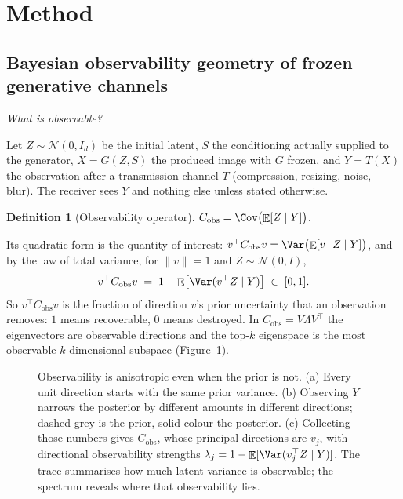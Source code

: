 \documentclass{article}
\theoremstyle{definition}
\newtheorem{definition}{Definition}
\DeclareMathOperator{\Exp}{\mathbb{E}}
\newcommand{\Cobs}{C_{\mathrm{obs}}}
\begin{document}
\section{Method}

\subsection{Bayesian observability geometry of frozen generative channels}
\label{sec:geometry}

\emph{What is observable?}

Let $Z\sim\mathcal N(0,I_d)$ be the initial latent, $S$ the conditioning actually supplied
to the generator, $X=G(Z,S)$ the produced image with $G$ frozen, and $Y=T(X)$ the
observation after a transmission channel $T$ (compression, resizing, noise, blur). The
receiver sees $Y$ and nothing else unless stated otherwise.

\begin{definition}[Observability operator]
$\Cobs=\Cov\bigl(\Exp[Z\mid Y]\bigr)$.
\end{definition}

Its quadratic form is the quantity of interest:
$v^\top\Cobs v=\Var\bigl(\Exp[v^\top Z\mid Y]\bigr)$, and by the law of total variance,
for $\|v\|=1$ and $Z\sim\mathcal N(0,I)$,
\begin{equation}
  v^\top\Cobs v \;=\; 1-\Exp\bigl[\Var(v^\top Z\mid Y)\bigr] \;\in\;[0,1].
  \label{eq:quadform}
\end{equation}
So $v^\top\Cobs v$ is the fraction of direction $v$'s prior uncertainty that an
observation removes: $1$ means recoverable, $0$ means destroyed. In
$\Cobs=V\Lambda V^\top$ the eigenvectors are observable directions and the top-$k$
eigenspace is the most observable $k$-dimensional subspace
(Figure~\ref{fig:geometry}).

\begin{figure}[t]
\centering

\caption{Observability is anisotropic even when the prior is not. (a) Every unit direction
starts with the same prior variance. (b) Observing $Y$ narrows the posterior by different
amounts in different directions; dashed grey is the prior, solid colour the posterior.
(c) Collecting those numbers gives $\Cobs$, whose principal directions are $v_j$, with directional observability strengths
$\lambda_j=1-\Exp[\Var(v_j^\top Z\mid Y)]$. The trace summarises how much latent
variance is observable; the spectrum reveals where that observability lies.}
\label{fig:geometry}
\end{figure}
\end{document}
